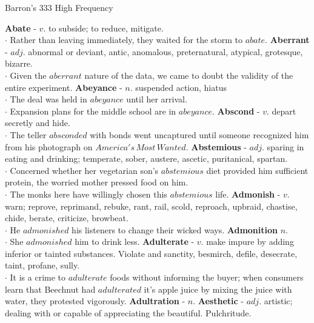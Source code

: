 \documentclass{exam}
\begin{document}
\begin{center}
\begin{huge}
Barron's 333 High Frequency
\end{huge}
\end{center}
\begin{questions}
\question \textbf{Abate} - $v.$ to subside; to reduce,  mitigate.\\
$\cdot$ Rather than leaving immediately, they waited for the storm to $abate$.
\question \textbf{Aberrant} - $adj.$ abnormal or deviant,  antic, anomalous, preternatural, atypical, grotesque, bizarre. \\
$\cdot$ Given the $aberrant$ nature of the data, we came to doubt the validity of the entire experiment.
\question \textbf{ Abeyance} - $n.$ suspended action, hiatus\\
$\cdot$ The deal was held in $abeyance$ until her arrival. \\
 $\cdot$ Expansion plans for the middle school are in $abeyance.$
\question \textbf{ Abscond} - $v.$ depart secretly and hide.\\
$\cdot$ The teller $absconded$ with bonds went uncaptured until someone recognized him from his photograph on $America's\,Most\,Wanted.$
\question \textbf{Abstemious} - $adj.$ sparing in eating and drinking; temperate, sober, austere, ascetic, puritanical, spartan.\\
$\cdot$ Concerned whether her vegetarian son's $abstemious$ diet provided him sufficient protein, the worried mother pressed food on him.\\
$\cdot$ The monks here have willingly chosen this $abstemious$ life.
\question \textbf{Admonish} - $v.$ warn; reprove, 	reprimand, rebuke, rant, rail, scold, reproach, upbraid, chastise, chide, berate, criticize, browbeat. \\
$\cdot$ He $admonished$ his listeners to change their wicked ways. \textbf{Admonition} $n.$\\
$\cdot$ She $admonished$ him to drink less.
\question \textbf{Adulterate} - $v.$ make impure by adding inferior or tainted substances. Violate and sanctity, besmirch, defile, desecrate, taint, profane, sully.\\
$\cdot$ It is a crime to $adulterate$ foods without informing the buyer; when consumers learn that Beechnut had $adulterated$ it's apple juice by mixing the juice with water, they protested vigorously. \textbf{Adultration} - $n$.
\question \textbf{Aesthetic} - $adj.$ artistic; dealing with or capable of appreciating the beautiful. Pulchritude.\\

\end{questions}
\end{document}
